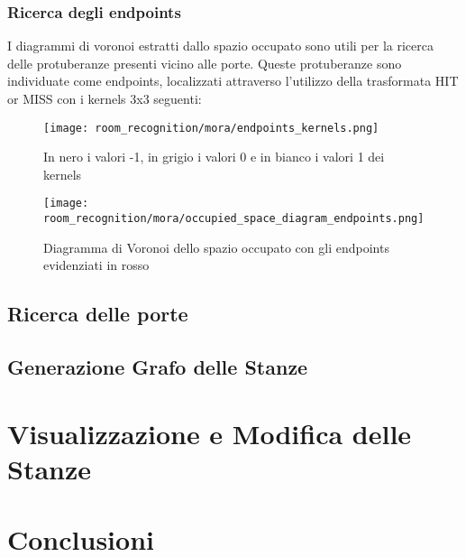 \subsubsection{Ricerca degli endpoints}
I diagrammi di voronoi estratti dallo spazio occupato sono utili per la ricerca delle protuberanze presenti vicino alle porte. Queste protuberanze sono individuate come endpoints, localizzati attraverso l'utilizzo della trasformata HIT or MISS con i kernels 3x3 seguenti:
\begin{figure}[H]
  \centering
  \texttt{[image: room\_recognition/mora/endpoints\_kernels.png]}
  \caption{In nero i valori -1, in grigio i valori 0 e in bianco i valori 1 dei kernels}
\end{figure}
\begin{figure}[H]
  \centering
  \texttt{[image: room\_recognition/mora/occupied\_space\_diagram\_endpoints.png]}
  \caption{Diagramma di Voronoi dello spazio occupato con gli endpoints evidenziati in rosso}
\end{figure}
\subsection{Ricerca delle porte}

\subsection{Generazione Grafo delle Stanze}

\section{Visualizzazione e Modifica delle Stanze}

\section{Conclusioni}